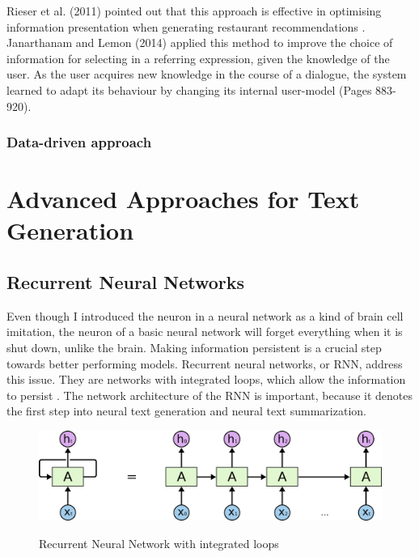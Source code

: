 Rieser et al. (2011) pointed out that this approach is effective in optimising information presentation when generating restaurant recommendations \cite{rieser}. Janarthanam and Lemon (2014) applied this method to improve the choice of information for selecting in a referring expression, given the knowledge of the user.  As the user acquires new knowledge in the course of a dialogue, the system learned to adapt its behaviour by changing its internal user-model \cite{janarthanam-lemon-2014-adaptive} (Pages 883-920).

\subsubsection{Data-driven approach}




\section{Advanced Approaches for Text Generation}
\subsection{Recurrent Neural Networks}
Even though I introduced the neuron in a neural network as a kind of brain cell imitation, the neuron of a basic neural network will forget everything when it is shut down, unlike the brain. Making information persistent is a crucial step towards better performing models. Recurrent neural networks, or RNN, address this issue. They are networks with integrated loops, which allow the information to persist \cite{olah}. The network architecture of the RNN is important, because it denotes the first step into neural text generation and neural text summarization. 

\begin{figure}
	\begin{center}
		\includegraphics[width=4.5in]{photos/RNN-unrolled}\\
		\caption{Recurrent Neural Network with integrated loops \cite{olah}}\label{rnn}
	\end{center}
\end{figure}

